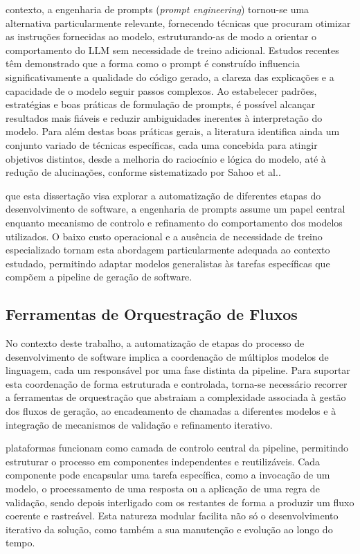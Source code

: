  contexto, a engenharia de prompts (\textit{prompt engineering}) tornou-se uma alternativa particularmente relevante, fornecendo técnicas que procuram otimizar as instruções fornecidas ao modelo, estruturando-as de modo a orientar o comportamento do LLM sem necessidade de treino adicional. Estudos recentes têm demonstrado que a forma como o prompt é construído influencia significativamente a qualidade do código gerado, a clareza das explicações e a capacidade de o modelo seguir passos complexos\cite{CopilotStudy}. Ao estabelecer padrões, estratégias e boas práticas de formulação de prompts\cite{PEinLLMS}, é possível alcançar resultados mais fiáveis e reduzir ambiguidades inerentes à interpretação do modelo. Para além destas boas práticas gerais, a literatura identifica ainda um conjunto variado de técnicas específicas, cada uma concebida para atingir objetivos distintos, desde a melhoria do raciocínio e lógica do modelo, até à redução de alucinações, conforme sistematizado por Sahoo et al.\cite{PETechniques}.\par

 que esta dissertação visa explorar a automatização de diferentes etapas do desenvolvimento de software, a engenharia de prompts assume um papel central enquanto mecanismo de controlo e refinamento do comportamento dos modelos utilizados. O baixo custo operacional e a ausência de necessidade de treino especializado tornam esta abordagem particularmente adequada ao contexto estudado, permitindo adaptar modelos generalistas às tarefas específicas que compõem a pipeline de geração de software.\par

\subsection{Ferramentas de Orquestração de Fluxos} \label{sec:ferramentas-orquestracao}

No contexto deste trabalho, a automatização de etapas do processo de desenvolvimento de software implica a coordenação de múltiplos modelos de linguagem, cada um responsável por uma fase distinta da pipeline. Para suportar esta coordenação de forma estruturada e controlada, torna-se necessário recorrer a ferramentas de orquestração que abstraiam a complexidade associada à gestão dos fluxos de geração, ao encadeamento de chamadas a diferentes modelos e à integração de mecanismos de validação e refinamento iterativo.

 plataformas funcionam como camada de controlo central da pipeline, permitindo estruturar o processo em componentes independentes e reutilizáveis. Cada componente pode encapsular uma tarefa específica, como a invocação de um modelo, o processamento de uma resposta ou a aplicação de uma regra de validação, sendo depois interligado com os restantes de forma a produzir um fluxo coerente e rastreável. Esta natureza modular facilita não só o desenvolvimento iterativo da solução, como também a sua manutenção e evolução ao longo do tempo.

